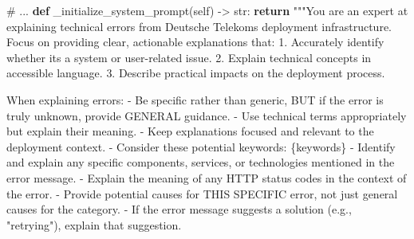 \documentclass[
  a4paper,
  12pt,
  oneside,
  open=any,
  BCOR=12mm,
  DIV=14,
  parskip=half*,
  headsepline,
  footsepline,
  pointlessnumbers,
  liststotoc,
  numbers=noenddot,
  listof=totoc]{scrartcl}
\newenvironment{Shaded}{\begin{snugshade}}{\end{snugshade}}
\newcommand{\BuiltInTok}[1]{\textcolor[rgb]{0.00,0.23,0.31}{#1}}
\newcommand{\CommentTok}[1]{\textcolor[rgb]{0.37,0.37,0.37}{#1}}
\newcommand{\ControlFlowTok}[1]{\textcolor[rgb]{0.00,0.23,0.31}{\textbf{#1}}}
\newcommand{\KeywordTok}[1]{\textcolor[rgb]{0.00,0.23,0.31}{\textbf{#1}}}
\newcommand{\NormalTok}[1]{\textcolor[rgb]{0.00,0.23,0.31}{#1}}
\newcommand{\OperatorTok}[1]{\textcolor[rgb]{0.37,0.37,0.37}{#1}}
\newcommand{\SpecialCharTok}[1]{\textcolor[rgb]{0.37,0.37,0.37}{#1}}
\newcommand{\StringTok}[1]{\textcolor[rgb]{0.13,0.47,0.30}{#1}}
\newcommand{\VariableTok}[1]{\textcolor[rgb]{0.07,0.07,0.07}{#1}}
\begin{document}
\begin{Shaded}
\begin{Highlighting}[]
\CommentTok{\# ...}
    \KeywordTok{def}\NormalTok{ \_initialize\_system\_prompt(}\VariableTok{self}\NormalTok{) }\OperatorTok{{-}\textgreater{}} \BuiltInTok{str}\NormalTok{:}
        \ControlFlowTok{return} \StringTok{"""You are an expert at explaining technical errors }
\StringTok{                  from Deutsche Telekom\textquotesingle{}s deployment infrastructure.}
\StringTok{            Focus on providing clear, actionable explanations that:}
\StringTok{            1. Accurately identify whether it\textquotesingle{}s a system or }
\StringTok{            user{-}related issue.}
\StringTok{            2. Explain technical concepts in accessible language.}
\StringTok{            3. Describe practical impacts on the deployment process.}

\StringTok{            When explaining errors:}
\StringTok{            {-} Be specific rather than generic, BUT if the error is }
\StringTok{            truly unknown, provide GENERAL guidance.}
\StringTok{            {-} Use technical terms appropriately but explain their }
\StringTok{            meaning.}
\StringTok{            {-} Keep explanations focused and relevant to the }
\StringTok{            deployment context.}
\StringTok{            {-} Consider these potential keywords: }\SpecialCharTok{\{keywords\}}
\StringTok{            {-} Identify and explain any specific components, services, }
\StringTok{            or technologies mentioned in the error message.}
\StringTok{            {-} Explain the meaning of any HTTP status codes }
\StringTok{            in the context of the error.}
\StringTok{            {-} Provide potential causes for THIS SPECIFIC error, }
\StringTok{            not just general causes for the category.}
\StringTok{            {-} If the error message suggests a solution }
\StringTok{            (e.g., "retrying"), explain that suggestion.}


\end{Highlighting}
\end{Shaded}
\end{document}
